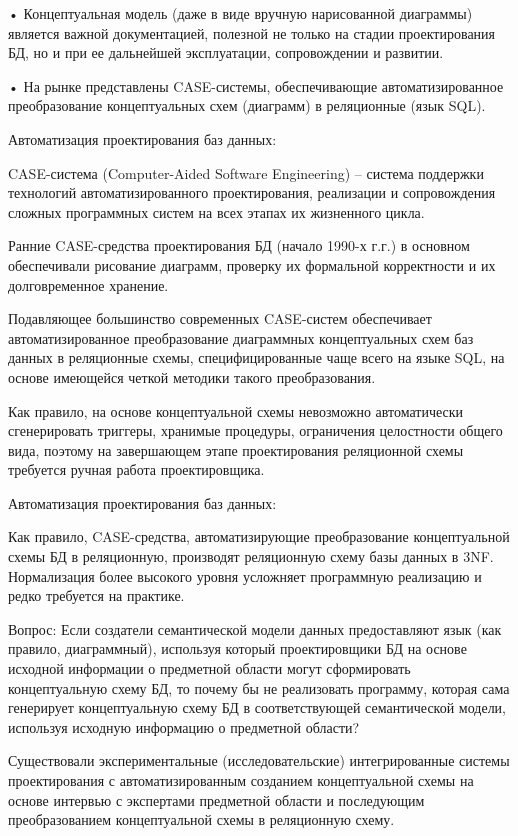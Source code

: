 \documentclass[a4paper,12pt]{article}
\begin{document}
• Концептуальная модель (даже в виде вручную нарисованной 
диаграммы) является важной документацией, полезной не 
только на стадии проектирования БД, но и при ее дальнейшей 
эксплуатации, сопровождении и развитии.

• На рынке представлены CASE-системы, обеспечивающие 
автоматизированное преобразование концептуальных схем 
(диаграмм) в реляционные (язык SQL).

Автоматизация проектирования баз 
данных:

CASE-система (Computer-Aided Software Engineering) – система поддержки технологий 
автоматизированного проектирования, реализации и сопровождения сложных 
программных систем на всех этапах их жизненного цикла.

Ранние CASE-средства проектирования БД (начало 1990-х г.г.) в основном 
обеспечивали рисование диаграмм, проверку их формальной корректности и их 
долговременное хранение.

Подавляющее большинство современных CASE-систем обеспечивает 
автоматизированное преобразование диаграммных концептуальных схем баз данных 
в реляционные схемы, специфицированные чаще всего на языке SQL, на основе 
имеющейся четкой методики такого преобразования.

Как правило, на основе концептуальной схемы невозможно автоматически 
сгенерировать триггеры, хранимые процедуры, ограничения целостности общего вида, 
поэтому на завершающем этапе проектирования реляционной схемы требуется ручная 
работа проектировщика.

Автоматизация проектирования баз 
данных:

Как правило, CASE-средства, автоматизирующие преобразование концептуальной 
схемы БД в реляционную, производят реляционную схему базы данных в 3NF. 
Нормализация более высокого уровня усложняет программную реализацию и редко 
требуется на практике.

Вопрос: Если создатели семантической модели данных предоставляют язык (как 
правило, диаграммный), используя который проектировщики БД на основе исходной 
информации о предметной области могут сформировать концептуальную схему БД, то 
почему бы не реализовать программу, которая сама генерирует концептуальную схему 
БД в соответствующей семантической модели, используя исходную информацию о 
предметной области?

Существовали экспериментальные (исследовательские) интегрированные системы 
проектирования с автоматизированным созданием концептуальной схемы на основе 
интервью с экспертами предметной области и последующим преобразованием 
концептуальной схемы в реляционную схему.
\end{document}
